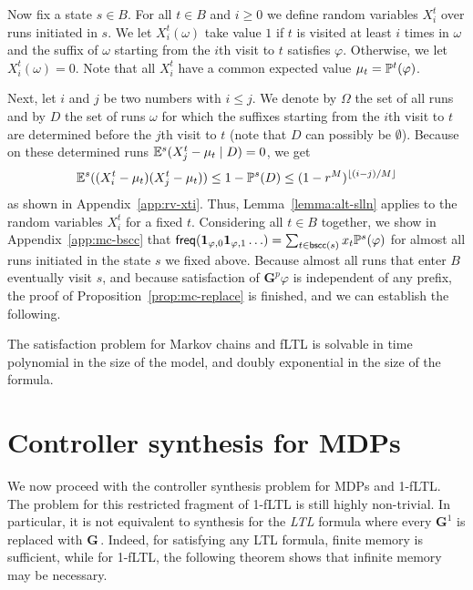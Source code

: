 \documentclass[a4paper,UKenglish]{lipics}
\newcommand{\bscc}[1]{\mathsf{bscc}(#1)}
\newcommand{\Gf}[1]{\mathbf{G}^{#1}}
\newcommand{\G}{\mathbf{G}\,}
\newcommand{\idf}{\mathbf{1}}
\newcommand{\E}[2][]{\ifblank{#1}{\mathbb{E}(#2)}{\mathbb{E}^{#1}(#2)}}
\renewcommand{\P}[2][]{\ifblank{#1}{\mathbb{P}(#2)}{\mathbb{P}^{#1}(#2)}}
\newcommand{\ssf}[1]{x_{#1}}
\newcommand{\freq}[1]{\mathsf{freq}(#1)}
\begin{document}
Now fix a state $s \in B$.
For all $t\in B$ and $i\ge 0$
we define random variables $X^t_i$ over runs initiated in $s$. We let $X^t_i(\omega)$ take value $1$ if $t$ is visited at least $i$ times in $\omega$ and the suffix of $\omega$ starting from the $i$th visit to $t$ satisfies $\varphi$. Otherwise, we let $X^t_i(\omega)=0$.
Note that all $X^t_i$ have a common expected value $\mu_t = \P[t]{\varphi}$.

Next, let $i$ and $j$ be two numbers with $i\le j$.
We denote by $\Omega$ the set of all runs and by $D$ the set of runs $\omega$ for which the suffixes starting from the $i$th visit to $t$ are determined before the $j$th visit to $t$ (note that $D$ can possibly be $\emptyset$).
Because on these determined runs $\E[s]{X^t_j - \mu_t \mid D}=0$, we get
\[
\E[s]{(X^t_i - \mu_t) (X^t_j - \mu_t)}
\le 1-\P[s]{D}
\le (1-r^M)^{\lfloor (i-j)/M\rfloor}
\]
as shown in Appendix~\ref{app:rv-xti}. 
Thus, Lemma~\ref{lemma:alt-slln} applies to the random variables $X^t_i$ for a fixed $t$.
Considering all $t\in B$ together, we show in Appendix~\ref{app:mc-bscc}
that
$
\freq{\idf_{\varphi,0}\idf_{\varphi,1}\ldots} =  
\sum_{t \in\bscc{s}} \ssf{t} \P[s]{\varphi}
$
for almost all runs initiated in the state $s$ we fixed above.
Because almost all runs that enter $B$ eventually visit $s$, and because satisfaction of  $\Gf{p}\varphi$ is independent of any prefix,
the proof of Proposition~\ref{prop:mc-replace} is finished, and we can establish the following.

\begin{theorem}
	The satisfaction problem for Markov chains and fLTL is solvable in time polynomial in the size of the model, and doubly exponential in the size of the formula. 
\end{theorem}




\section{Controller synthesis for MDPs}
\label{sec:mdp}

We now proceed with the controller synthesis problem for MDPs  and 1-fLTL. The problem for this restricted fragment of 1-fLTL is still highly non-trivial. In particular, it is not equivalent to synthesis for the \emph{LTL} formula where every $\Gf{1}$ is replaced with $\G$. Indeed, for satisfying any LTL formula, finite memory is sufficient, while for 1-fLTL, the following theorem shows that infinite memory may be necessary.
\end{document}
